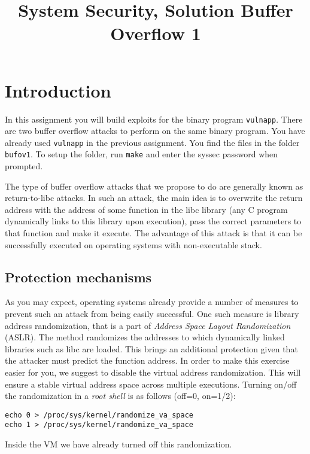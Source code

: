\documentclass[a4paper,11pt]{article}
\title{System Security,
\ifsolution Solution \else \fi
Buffer Overflow 1}
\begin{document}
\maketitle


\section*{Introduction}

In this assignment you will build exploits for the binary program {\tt vulnapp}.
There are two buffer overflow attacks to perform on the same binary program. You
have already used {\tt vulnapp} in the previous assignment. You find the files
in the folder \texttt{bufov1}. To setup the folder, run \texttt{make} and
enter the syssec password when prompted.

The type of buffer overflow attacks that we propose to do are generally known as
return-to-libc attacks. In such an attack, the main idea is to overwrite the
return address with the address of some function in the libc library (any C
program dynamically links to this library upon execution), pass the correct
parameters to that function and make it execute. The advantage of this attack is
that it can be successfully executed on operating systems with non-executable
stack.

\subsection*{Protection mechanisms}

As you may expect, operating systems already provide a number of measures to
prevent such an attack from being easily successful. One such measure is library
address randomization, that is a part of \textit{Address Space Layout
Randomization} (ASLR). The method randomizes the addresses to which dynamically
linked libraries such as libc are loaded. This brings an additional protection
given that the attacker must predict the function address. In order to make this
exercise easier for you, we suggest to disable the virtual address
randomization. This will ensure a stable virtual address space across multiple
executions. Turning on/off the randomization in a \textit{root shell} is as
follows (off=0, on=1/2):

\begin{verbatim}
echo 0 > /proc/sys/kernel/randomize_va_space
echo 1 > /proc/sys/kernel/randomize_va_space
\end{verbatim}

Inside the VM we have already turned off this randomization.
\end{document}
